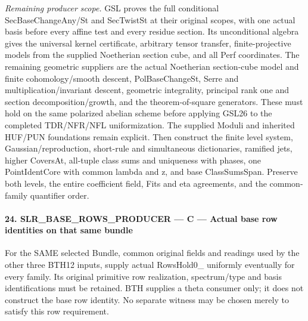 \emph{Remaining producer scope.} GSL proves the full conditional SecBaseChangeAny/St and SecTwistSt at their original scopes, with one actual basis before every affine test and every residue section. Its unconditional algebra gives the universal kernel certificate, arbitrary tensor transfer, finite-projective models from the supplied Noetherian section cube, and all Perf coordinates. The remaining geometric suppliers are the actual Noetherian section-cube model and finite cohomology/smooth descent, PolBaseChangeSt, Serre and multiplication/invariant descent, geometric integrality, principal rank one and section decomposition/growth, and the theorem-of-square generators. These must hold on the same polarized abelian scheme before applying GSL26 to the completed TDR/NFR/NFL uniformization. The supplied Moduli and inherited HUF/PUN foundations remain explicit. Then construct the finite level system, Gaussian/reproduction, short-rule and simultaneous dictionaries, ramified jets, higher CoversAt, all-tuple class sums and uniqueness with phases, one PointIdentCore with common lambda and z, and base ClassSumsSpan. Preserve both levels, the entire coefficient field, Fits and eta agreements, and the common-family quantifier order.



\paragraph{24. SLR\_\allowbreak BASE\_\allowbreak ROWS\_\allowbreak PRODUCER — C — Actual base row identities on that same bundle}

For the SAME selected Bundle, common original fields and readings used by the other three BTH12 inputs, supply actual RowsHold0\_ uniformly eventually for every family. Its original primitive row realization, spectrum/type and basis identifications must be retained. BTH supplies a theta consumer only; it does not construct the base row identity. No separate witness may be chosen merely to satisfy this row requirement.


